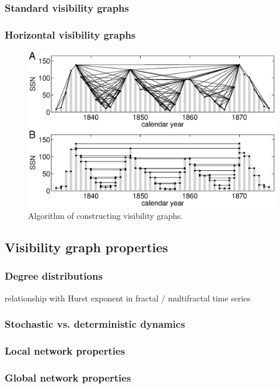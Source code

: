 		\subsubsection{Standard visibility graphs}
		\subsubsection{Horizontal visibility graphs}
			\begin{figure}
			  \centering
			  \includegraphics[width=\columnwidth]{Chapter04_VisibilityGt/TSspotnumberYear.eps}
			  \caption{Algorithm of constructing visibility graphs. \label{fig_chap04:timeseriesSS}}
			\end{figure}

	\subsection{Visibility graph properties}
		\subsubsection{Degree distributions}
		relationship with Hurst exponent in fractal / multifractal time series
		\subsubsection{Stochastic vs. deterministic dynamics}
		\subsubsection{Local network properties}
		\subsubsection{Global network properties}
